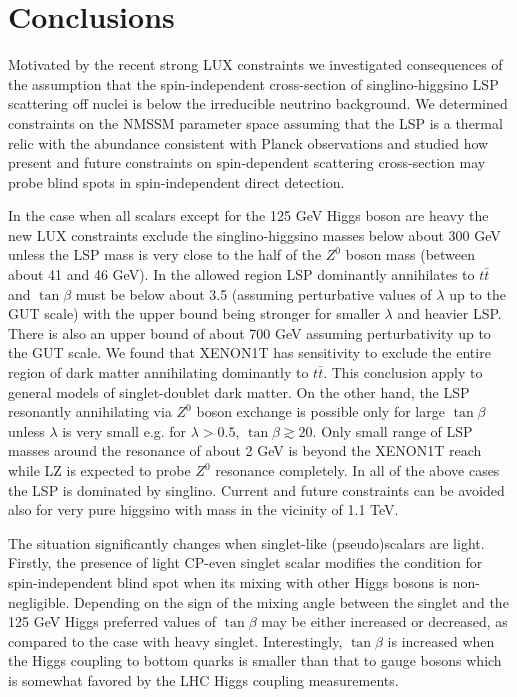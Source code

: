 \documentclass[12pt,twoside]{article}
\begin{document}
\section{Conclusions}
\label{sec:concl}

Motivated by the recent strong LUX constraints we investigated consequences of the assumption that the spin-independent cross-section of
singlino-higgsino LSP scattering off nuclei is below the irreducible neutrino background. We determined constraints on the NMSSM parameter space
assuming that the LSP is a thermal relic with the abundance consistent with Planck observations and studied how present and future constraints on
spin-dependent scattering cross-section may probe blind spots in spin-independent direct detection.

In the case when all scalars except for the 125 GeV Higgs boson are heavy the new LUX constraints exclude the singlino-higgsino masses below
about 300
GeV
unless the LSP mass is very close to the half of the $Z^0$ boson mass (between about 41 and 46 GeV). In the allowed region LSP
dominantly annihilates to $t\bar{t}$ and $\tan\beta$ must be below about 3.5 (assuming perturbative values of $\lambda$ up to the GUT scale) with the
upper bound being stronger for smaller $\lambda$ and heavier LSP. There is
also an upper bound of about 700 GeV assuming perturbativity up to the GUT scale. We found that XENON1T has sensitivity to exclude the entire region
of dark matter annihilating dominantly to $t\bar{t}$. This conclusion apply to general models of singlet-doublet dark matter. On the other hand, the
LSP resonantly annihilating via $Z^0$ boson exchange is possible only for large $\tan\beta$ unless $\lambda$ is very small e.g. for $\lambda>0.5$,
$\tan\beta\gtrsim20$. Only small range of LSP masses around the resonance of about 2 GeV is beyond the XENON1T reach while LZ is expected to probe
$Z^0$ resonance completely.
In all of the above cases the LSP is dominated by singlino. Current and future constraints can be avoided also for very pure higgsino with mass in
the vicinity of 1.1 TeV. 

The situation significantly changes when singlet-like (pseudo)scalars are light. Firstly, the presence of light CP-even singlet scalar modifies the
condition for spin-independent blind spot when its mixing with other Higgs bosons is non-negligible. Depending on the sign of the mixing angle
between the singlet and the 125 GeV Higgs preferred values of $\tan\beta$ may be either increased or decreased, as compared to the case with heavy
singlet. Interestingly, $\tan\beta$ is increased when the Higgs coupling to bottom quarks is smaller than that to gauge bosons which is somewhat
favored by the LHC Higgs coupling measurements.
\end{document}
